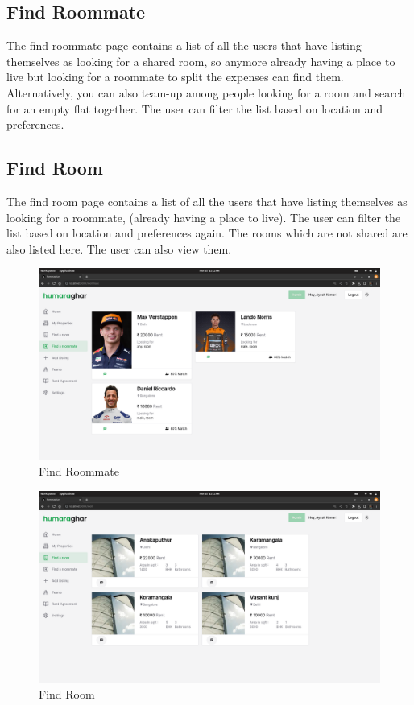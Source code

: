 \subsection{Find Roommate}
The find roommate page contains a list of all the users that have listing themselves as looking for a shared room, so anymore already having a place to live but looking for a roommate to split
the expenses can find them. Alternatively, you can also team-up among people looking for a room and search for an empty flat together. The user can filter the list based on
location and preferences.


\subsection{Find Room}
The find room page contains a list of all the users that have listing themselves as looking for a roommate, (already having a place to live). The user can filter the list based on
location and preferences again. The rooms which are not shared are also listed here. The user can also view them.

\begin{figure}[h]
    \centering
    \includegraphics[width=1\textwidth]{Images/screenshots/roommates.png}
    \caption{Find Roommate}
\end{figure}

\begin{figure}[h]
    \centering
    \includegraphics[width=1\textwidth]{Images/screenshots/rooms.png}
    \caption{Find Room}
\end{figure}

